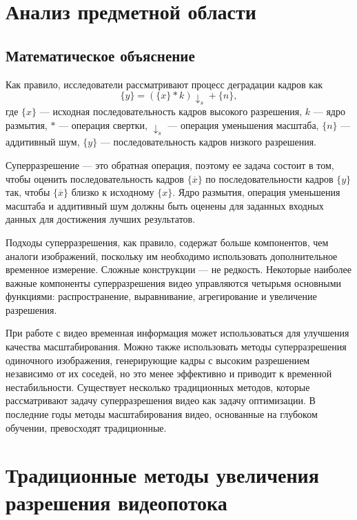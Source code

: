 \documentclass{bmstu}
\begin{document}
\chapter{Анализ предметной области}

\section{Математическое объяснение}

Как правило, исследователи рассматривают процесс деградации кадров как
\begin{equation}
\{y\} = (\{x\} * k) \downarrow _{s} + \{n\},
\end{equation}
где $\{x\}$ --- исходная последовательность кадров высокого разрешения, $k$ --- ядро размытия, $*$ --- операция свертки, $\downarrow _{s}$ --- операция уменьшения масштаба, $\{n\}$ --- аддитивный шум, $\{y\}$ --- последовательность кадров низкого разрешения.

Суперразрешение --- это обратная операция, поэтому ее задача состоит в том, чтобы оценить последовательность кадров $\{\overline{x}\}$ по последовательности кадров $\{y\}$ так, чтобы $\{\overline{x}\}$ близко к исходному $\{x\}$. 
Ядро размытия, операция уменьшения масштаба и аддитивный шум должны быть оценены для заданных входных данных для достижения лучших результатов.

Подходы суперразрешения, как правило, содержат больше компонентов, чем аналоги изображений, поскольку им необходимо использовать дополнительное временное измерение. 
Сложные конструкции --- не редкость. 
Некоторые наиболее важные компоненты суперразрешения видео управляются четырьмя основными функциями: распространение, выравнивание, агрегирование и увеличение разрешения.

При работе с видео временная информация может использоваться для улучшения качества масштабирования. 
Можно также использовать методы суперразрешения одиночного изображения, генерирующие кадры с высоким разрешением независимо от их соседей, но это менее эффективно и приводит к временной нестабильности. 
Существует несколько традиционных методов, которые рассматривают задачу суперразрешения видео как задачу оптимизации.  
В последние годы методы масштабирования видео, основанные на глубоком обучении, превосходят традиционные.

\chapter{Традиционные методы увеличения разрешения видеопотока}
\end{document}
